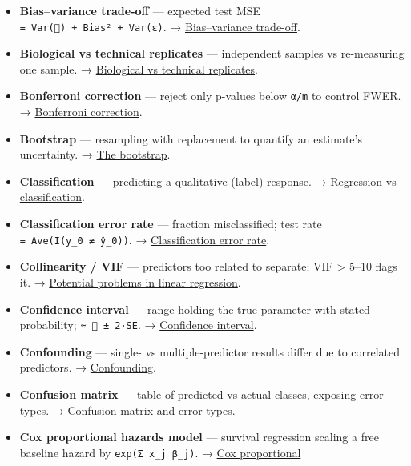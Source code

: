 \documentclass[
  10pt,
  letterpaper,
  onecolumn]{article}
\begin{document}
\begin{itemize}
  \textbf{Bias} --- error from approximating a complex truth with a
  simpler model. → \protect\hyperlink{bias}{Bias}.
\item
  \textbf{Bias--variance trade-off} --- expected test MSE
  \texttt{=\ Var()\ +\ Bias²\ +\ Var(ε)}. →
  \protect\hyperlink{biasvariance-trade-off}{Bias--variance trade-off}.
\item
  \textbf{Biological vs technical replicates} --- independent samples vs
  re-measuring one sample. →
  \protect\hyperlink{biological-vs-technical-replicates}{Biological vs
  technical replicates}.
\item
  \textbf{Bonferroni correction} --- reject only p-values below
  \texttt{α/m} to control FWER. →
  \protect\hyperlink{bonferroni-correction}{Bonferroni correction}.
\item
  \textbf{Bootstrap} --- resampling with replacement to quantify an
  estimate's uncertainty. → \protect\hyperlink{the-bootstrap}{The
  bootstrap}.
\item
  \textbf{Classification} --- predicting a qualitative (label) response.
  → \protect\hyperlink{regression-vs-classification}{Regression vs
  classification}.
\item
  \textbf{Classification error rate} --- fraction misclassified; test
  rate \texttt{=\ Ave(I(y\_0\ ≠\ ŷ\_0))}. →
  \protect\hyperlink{classification-error-rate}{Classification error
  rate}.
\item
  \textbf{Collinearity / VIF} --- predictors too related to separate;
  VIF \textgreater{} 5--10 flags it. →
  \protect\hyperlink{potential-problems-in-linear-regression}{Potential
  problems in linear regression}.
\item
  \textbf{Confidence interval} --- range holding the true parameter with
  stated probability; \texttt{≈\ \ ±\ 2·SE}. →
  \protect\hyperlink{confidence-interval}{Confidence interval}.
\item
  \textbf{Confounding} --- single- vs multiple-predictor results differ
  due to correlated predictors. →
  \protect\hyperlink{confounding}{Confounding}.
\item
  \textbf{Confusion matrix} --- table of predicted vs actual classes,
  exposing error types. →
  \protect\hyperlink{confusion-matrix-and-error-types}{Confusion matrix
  and error types}.
\item
  \textbf{Cox proportional hazards model} --- survival regression
  scaling a free baseline hazard by \texttt{exp(Σ\ x\_j\ β\_j)}. →
  \protect\hyperlink{cox-proportional-hazards-model}{Cox proportional
}
\end{itemize}
\end{document}

